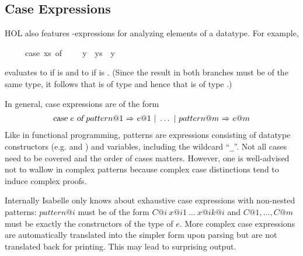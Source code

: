 %
\begin{isabellebody}%
\def\isabellecontext{case{\isacharunderscore}exprs}%
%
\isadelimtheory
%
\endisadelimtheory
%
\isatagtheory
%
\endisatagtheory
{\isafoldtheory}%
%
\isadelimtheory
%
\endisadelimtheory
%
\begin{isamarkuptext}%
\subsection{Case Expressions}
\label{sec:case-expressions}%
HOL also features -expressions for analyzing
elements of a datatype. For example,
\begin{isabelle}%
\ \ \ \ \ case\ xs\ of\ {\isacharbrackleft}{\isacharbrackright}\ {\isasymRightarrow}\ {\isacharbrackleft}{\isacharbrackright}\ {\isacharbar}\ y\ {\isacharhash}\ ys\ {\isasymRightarrow}\ y%
\end{isabelle}
evaluates to \isa{{\isacharbrackleft}{\isacharbrackright}} if  is \isa{{\isacharbrackleft}{\isacharbrackright}} and to  if 
 is . (Since the result in both branches must be of
the same type, it follows that  is of type  and hence
that  is of type .)

In general, case expressions are of the form
\[
\begin{array}{c}
\isa{case}~e~\isa{of}\ pattern@1~\isa{{\isasymRightarrow}}~e@1\ \isa{{\isacharbar}}\ \dots\
 \isa{{\isacharbar}}~pattern@m~\isa{{\isasymRightarrow}}~e@m
\end{array}
\]
Like in functional programming, patterns are expressions consisting of
datatype constructors (e.g. \isa{{\isacharbrackleft}{\isacharbrackright}} and \isa{{\isacharhash}})
and variables, including the wildcard ``\verb$_$''.
Not all cases need to be covered and the order of cases matters.
However, one is well-advised not to wallow in complex patterns because
complex case distinctions tend to induce complex proofs.

\begin{warn}
Internally Isabelle only knows about exhaustive case expressions with
non-nested patterns: $pattern@i$ must be of the form
$C@i~x@ {i1}~\dots~x@ {ik@i}$ and $C@1, \dots, C@m$ must be exactly the
constructors of the type of $e$.
%
More complex case expressions are automatically
translated into the simpler form upon parsing but are not translated
back for printing. This may lead to surprising output.
\end{warn}


\end{isamarkuptext}
\end{isabellebody}
